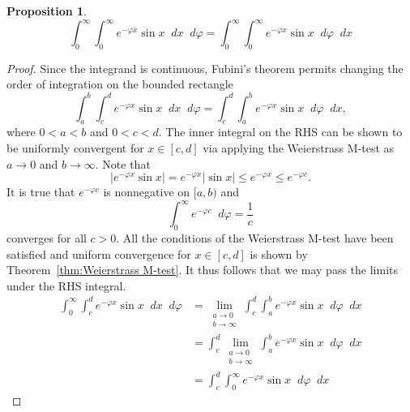 \documentclass[a4paper]{article}
\newcommand*\diff{\mathop{}\!d} %
\newtheorem{proposition}[theorem]{Proposition}
\theoremstyle{definition}
\begin{document}
\begin{proposition} \label{thm:double integral proposition}
    \begin{equation*}
        \int_{0}^{\infty} \int_{0}^{\infty} e^{-\varphi x} \sin x \diff x \diff \varphi = \int_{0}^{\infty} \int_{0}^{\infty} e^{-\varphi x} \sin x  \diff \varphi \diff x
    \end{equation*}
\end{proposition}
\begin{proof}
    Since the integrand is continuous, Fubini's theorem permits changing the order of integration on the bounded rectangle
    \begin{equation*}
        \int_{a}^{b} \int_{c}^{d} e^{-\varphi x} \sin x \diff x \diff \varphi = \int_{c}^{d} \int_{a}^{b} e^{-\varphi x} \sin x  \diff \varphi \diff x,
    \end{equation*}
    where $0 < a < b$ and $0 < c < d$.
    The inner integral on the RHS can be shown to be uniformly convergent for $x \in [c,d]$ via applying the Weierstrass M-test as $a \to 0$ and $b \to \infty$.
    Note that
    \begin{equation*}
        \left|e^{-\varphi x} \sin x \right| = e^{-\varphi x} |\sin x| \leq e^{-\varphi x} \leq e^{-\varphi c}.
    \end{equation*}
    It is true that $e^{-\varphi c}$ is nonnegative on $[a,b)$ and
    \begin{equation*}
        \int_{0}^{\infty} e^{-\varphi c} \diff \varphi = \frac{1}{c}
    \end{equation*}
    converges for all $c>0$.
    All the conditions of the Weierstrass M-test have been satisfied and uniform convergence for $x \in [c,d]$ is shown by Theorem~\ref{thm:Weierstrass M-test}.
    It thus follows that we may pass the limits under the RHS integral.
    \begin{align*}
        \int_{0}^{\infty} \int_{c}^{d} e^{-\varphi x} \sin x \diff x \diff \varphi & = \lim_{\substack{a \to 0                                                     \\ b \to \infty}} \int_{c}^{d} \int_{a}^{b} e^{-\varphi x} \sin x  \diff \varphi \diff x \\
                                                                                   & = \int_{c}^{d} \lim_{\substack{a \to 0                                        \\ b \to \infty}} \int_{a}^{b} e^{-\varphi x} \sin x  \diff \varphi \diff x \\
                                                                                   & = \int_{c}^{d} \int_{0}^{\infty} e^{-\varphi x} \sin x  \diff \varphi \diff x

\end{align*}
\end{proof}
\end{document}
